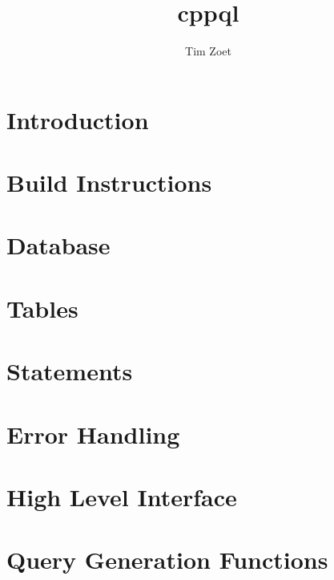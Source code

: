 \documentclass[twoside,a4paper,smallborder=true]{refart}
\title{cppql}
\author{Tim Zoet}
\date{}
\begin{document}
\maketitle

\tableofcontents
\newpage

\section{Introduction}
\label{section:introduction}

\newpage

\section{Build Instructions}
\label{section:build}

\newpage

\section{Database}
\label{section:database}

\newpage

\section{Tables}
\label{section:tables}

\newpage

\section{Statements}
\label{section:statements}

\newpage

\section{Error Handling}
\label{section:errors}
%
\newpage

\section{High Level Interface}
\label{section:hli}

\newpage

\section{Query Generation Functions}
\label{section:gen}
%
\newpage

 
 
\printindex
\end{document}
